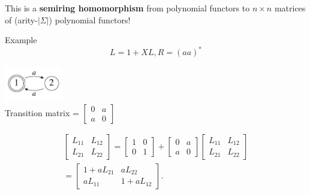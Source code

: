 \documentclass[xcolor=svgnames,12pt]{beamer}
\newenvironment{xframe}[1][]
  {\begin{frame}[fragile,environment=xframe,#1]}
  {\end{frame}}
\renewcommand{\emph}{\textbf}
\begin{document}
\begin{xframe}
  \begin{center}
    This is a \emph{semiring homomorphism} from polynomial functors to
    $n \times n$ matrices of (arity-$|\Sigma|$) polynomial functors!
  \end{center}
\end{xframe}

\begin{xframe}{Example}
\[ L = 1 + XL, R = (aa)^* \]
\begin{center}
\includegraphics[width=1in]{even-DFA} \\
Transition matrix = $\begin{bmatrix}
  0 & a \\ a & 0
\end{bmatrix}$

\begin{multline*}
  \begin{bmatrix}
    L_{11} & L_{12} \\
    L_{21} & L_{22}
  \end{bmatrix}
  =
  \begin{bmatrix}
    1 & 0 \\
    0 & 1
  \end{bmatrix}
  +
  \begin{bmatrix}
    0 & a \\
    a & 0
  \end{bmatrix}
  \begin{bmatrix}
    L_{11} & L_{12} \\
    L_{21} & L_{22}
  \end{bmatrix}
  \\
  =
  \begin{bmatrix}
    1 + a L_{21} & a L_{22} \\
    a L_{11} & 1+ a L_{12}
  \end{bmatrix}.
\end{multline*}
\end{center}
\end{xframe}
\end{document}
